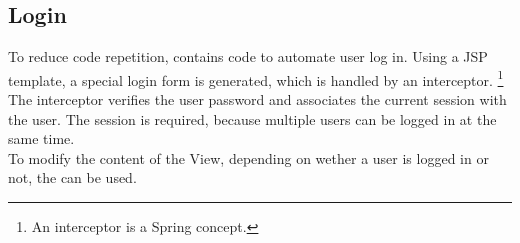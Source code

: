 \subsection*{Login}
To reduce code repetition, \salespoint{} contains code to automate user log in.
Using a JSP template, a special login form is generated, which is handled by an interceptor.
\footnote{An interceptor is a Spring concept.}
The interceptor verifies the user password and associates the current session with the user.
The session is required, because multiple users can be logged in at the same time.\\

To modify the content of the View, depending on wether a user is logged in or not, the  can be used.

